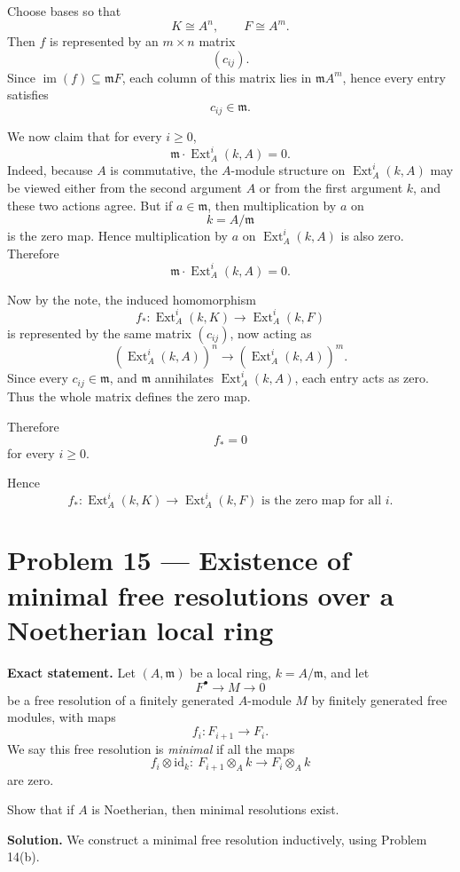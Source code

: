 \documentclass[12pt,a4paper,oneside]{report}
\theoremstyle{notespace}
\begin{document}
Choose bases so that
\[
K\cong A^n,\qquad F\cong A^m.
\]
Then \(f\) is represented by an \(m\times n\) matrix
\[
(c_{ij}).
\]
Since \(\operatorname{im}(f)\subseteq \mathfrak m F\), each column of this matrix lies in \(\mathfrak m A^m\), hence every entry satisfies
\[
c_{ij}\in \mathfrak m.
\]

We now claim that for every \(i\ge 0\),
\[
\mathfrak m\cdot \operatorname{Ext}_A^i(k,A)=0.
\]
Indeed, because \(A\) is commutative, the \(A\)-module structure on \(\operatorname{Ext}_A^i(k,A)\) may be viewed either from the second argument \(A\) or from the first argument \(k\), and these two actions agree. But if \(a\in \mathfrak m\), then multiplication by \(a\) on
\[
k=A/\mathfrak m
\]
is the zero map. Hence multiplication by \(a\) on \(\operatorname{Ext}_A^i(k,A)\) is also zero. Therefore
\[
\mathfrak m\cdot \operatorname{Ext}_A^i(k,A)=0.
\]

Now by the note, the induced homomorphism
\[
f_*:\operatorname{Ext}_A^i(k,K)\to \operatorname{Ext}_A^i(k,F)
\]
is represented by the same matrix \((c_{ij})\), now acting as
\[
(\operatorname{Ext}_A^i(k,A))^n\to (\operatorname{Ext}_A^i(k,A))^m.
\]
Since every \(c_{ij}\in \mathfrak m\), and \(\mathfrak m\) annihilates \(\operatorname{Ext}_A^i(k,A)\), each entry acts as zero. Thus the whole matrix defines the zero map.

Therefore
\[
f_*=0
\]
for every \(i\ge 0\).

\medskip

Hence
\[
\boxed{
	f_*:\operatorname{Ext}_A^i(k,K)\longrightarrow \operatorname{Ext}_A^i(k,F)
	\text{ is the zero map for all }i.
}
\]	

\section{Problem 15 --- Existence of minimal free resolutions over a Noetherian local ring}

\textbf{Exact statement.}
Let \((A,\mathfrak m)\) be a local ring, \(k=A/\mathfrak m\), and let
\[
F^\bullet \to M \to 0
\]
be a free resolution of a finitely generated \(A\)-module \(M\) by finitely generated free modules, with maps
\[
f_i:F_{i+1}\to F_i.
\]
We say this free resolution is \emph{minimal} if all the maps
\[
f_i\otimes \mathrm{id}_k:\ F_{i+1}\otimes_A k \to F_i\otimes_A k
\]
are zero.

Show that if \(A\) is Noetherian, then minimal resolutions exist.

\textbf{Solution.}
We construct a minimal free resolution inductively, using Problem 14(b).
\end{document}
